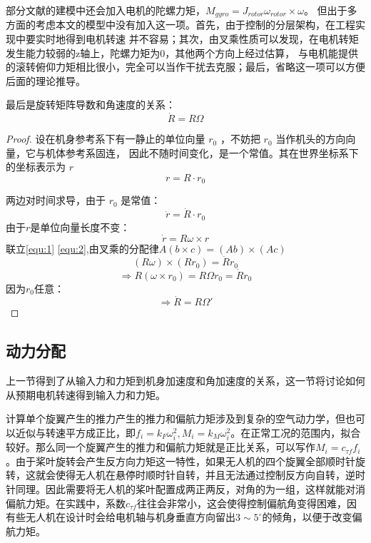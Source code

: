     部分文献的建模中还会加入电机的陀螺力矩\cite{quanbook}，$M_{gyro}=J_{rotor} \omega_{rotor} \times \omega$。 
    但出于多方面的考虑本文的模型中没有加入这一项。首先，由于控制的分层架构，在工程实现中要实时地得到电机转速  并不容易；其次，由叉乘性质可以发现，在电机转矩发生能力较弱的z轴上，陀螺力矩为$0$，其他两个方向上经过估算，
    与电机能提供的滚转俯仰力矩相比很小，完全可以当作干扰去克服；最后，省略这一项可以方便后面的理论推导。

最后是旋转矩阵导数和角速度的关系：
  \begin{equation}
    \dot R=R\Omega
    \label{equ:dotR}
  \end{equation}

\begin{proof}
  设在机身参考系下有一静止的单位向量 $r_0$ ，不妨把 $r_0$ 当作机头的方向向量，它与机体参考系固连，
  因此不随时间变化，是一个常值。其在世界坐标系下的坐标表示为 $r$ 
  $$r=R \cdot r_0$$
  
  两边对时间求导，由于 $r_0$ 是常值：
  \begin{equation}
    \dot r= \dot R \cdot r_0
    \label{equ:1}
  \end{equation}
  由于$r$是单位向量长度不变：
  \begin{equation}
    \dot r=R \omega \times r
    \label{equ:2}
  \end{equation}
  联立\ref{equ:1}  \ref{equ:2},由叉乘的分配律$A(b\times c)=(Ab)\times (Ac)$
  $$(R\omega)\times(Rr_0)=\dot R r_0$$
  $$\Rightarrow R(\omega \times r_0)=R\Omega r_0=\dot R r_0$$
  因为$r_0$任意：
  $$\Rightarrow \dot R=R \Omega'$$

\end{proof}

\subsection{动力分配}
上一节得到了从输入力和力矩到机身加速度和角加速度的关系，这一节将讨论如何从预期电机转速得到输入力和力矩。

计算单个旋翼产生的推力产生的推力和偏航力矩涉及到复杂的空气动力学，但也可以近似与转速平方成正比\cite{minimumsnap}，即$f_i=k_F \omega_i^2,M_i=k_M \omega_i^2$。在正常工况的范围内，拟合较好。那么同一个旋翼产生的推力和偏航力矩就是正比关系，可以写作$M_i=c_{\tau f}f_i$。由于桨叶旋转会产生反方向力矩这一特性，如果无人机的四个旋翼全部顺时针旋转，这就会使得无人机在悬停时顺时针自转，并且无法通过控制反方向自转，逆时针同理。因此需要将无人机的桨叶配置成两正两反，对角的为一组，这样就能对消偏航力矩。在实践中，系数$c_{\tau f}$往往会非常小，这会使得控制偏航角变得困难，因有些无人机在设计时会给电机轴与机身垂直方向留出$3\sim5^\circ$的倾角，以便于改变偏航力矩。

